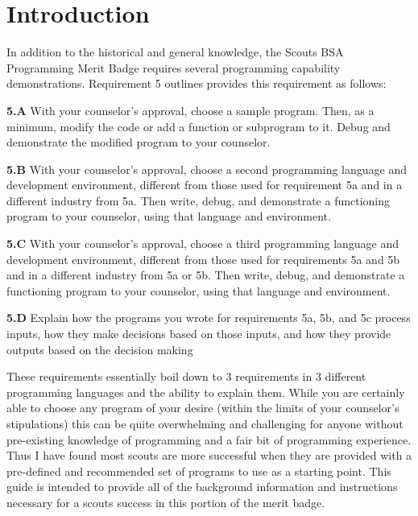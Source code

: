 \chapter{Introduction}
\label{chap:Introduction}

  In addition to the historical and general knowledge, the Scouts BSA Programming Merit Badge requires
    several programming capability demonstrations.
  Requirement 5 outlines provides this requirement as follows:


  \vspace{5pt}
  \begin{mdframed}[]
    \textbf{5.A} 
      With your counselor’s approval, choose a sample program.
      Then, as a minimum, modify the code or add a function or subprogram to it. 
      Debug and demonstrate the modified program to your counselor.

    \textbf{5.B} 
      With your counselor’s approval, choose a second programming language 
        and development environment, different from those used for requirement 5a and in a
        different industry from 5a.
      Then write, debug, and demonstrate a functioning program to your counselor, using 
        that language and environment.

    \textbf{5.C}
      With your counselor’s approval, choose a third programming language and development
        environment, different from those used for requirements 5a and 5b and in a different industry
        from 5a or 5b.
      Then write, debug, and demonstrate a functioning program to your counselor, using that
        language and environment.

    \textbf{5.D}
        Explain how the programs you wrote for requirements 5a, 5b, and 5c process inputs, how they make
          decisions based on those inputs, and how they provide outputs based on the decision making
  \end{mdframed}

  These requirements essentially boil down to 3 requirements in 3 different programming languages
    and the ability to explain them.
  While you are certainly able to choose any program of your desire (within the limits of your
    counselor's stipulations) this can be quite overwhelming and challenging for anyone
    without pre-existing knowledge of programming and a fair bit of programming experience.
  Thus I have found most scouts are more successful when they are provided with a pre-defined and
    recommended set of programs to use as a starting point.
  This guide is intended to provide all of the background information and instructions necessary
    for a scouts success in this portion of the merit badge.

